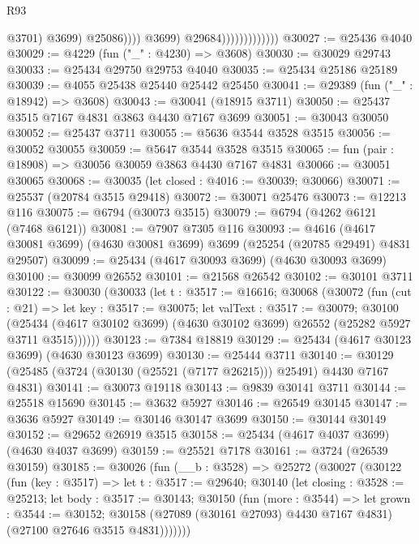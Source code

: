 \begin{lexlean}{R93}
\begin{coremodule}
                                            @3701)
                                          @3699)
                                        @25086))))
                                @3699)
                              @29684)))))))))))))
@30027 := @25436 @4040
@30029 := @4229 (fun ("_" : @4230) => @3608)
@30030 := @30029 @29743
@30033 := @25434 @29750 @29753 @4040
@30035 := @25434 @25186 @25189
@30039 := @4055 @25438 @25440 @25442 @25450
@30041 := @29389 (fun ("_" : @18942) => @3608)
@30043 := @30041 (@18915 @3711)
@30050 := @25437 @3515 @7167 @4831 @3863 @4430 @7167 @3699
@30051 := @30043 @30050
@30052 := @25437 @3711
@30055 := @5636 @3544 @3528 @3515
@30056 := @30052 @30055
@30059 := @5647 @3544 @3528 @3515
@30065 := fun (pair : @18908) => @30056 @30059 @3863 @4430 @7167 @4831
@30066 := @30051 @30065
@30068 := @30035 (let closed : @4016 := @30039; @30066)
@30071 := @25537 (@20784 @3515 @29418)
@30072 := @30071 @25476
@30073 := @12213 @116
@30075 := @6794 (@30073 @3515)
@30079 := @6794 (@4262 @6121 (@7468 @6121))
@30081 := @7907 @7305 @116
@30093 := @4616
    (@4617 @30081 @3699)
    (@4630 @30081 @3699)
    @3699
    (@25254 (@20785 @29491) @4831 @29507)
@30099 := @25434 (@4617 @30093 @3699) (@4630 @30093 @3699)
@30100 := @30099 @26552
@30101 := @21568 @26542
@30102 := @30101 @3711
@30122 := @30030
    (@30033
      (let t : @3517 := @16616;
      @30068
        (@30072
          (fun (cut : @21) =>
          let key : @3517 := @30075;
          let valText : @3517 := @30079;
          @30100
            (@25434 (@4617 @30102 @3699) (@4630 @30102 @3699) @26552 (@25282 @5927 @3711 @3515))))))
@30123 := @7384 @18819
@30129 := @25434 (@4617 @30123 @3699) (@4630 @30123 @3699)
@30130 := @25444 @3711
@30140 := @30129 (@25485 (@3724 (@30130 (@25521 (@7177 @26215))) @25491) @4430 @7167 @4831)
@30141 := @30073 @19118
@30143 := @9839 @30141 @3711
@30144 := @25518 @15690
@30145 := @3632 @5927
@30146 := @26549 @30145
@30147 := @3636 @5927
@30149 := @30146 @30147 @3699
@30150 := @30144 @30149
@30152 := @29652 @26919 @3515
@30158 := @25434 (@4617 @4037 @3699) (@4630 @4037 @3699)
@30159 := @25521 @7178
@30161 := @3724 (@26539 @30159)
@30185 := @30026
    (fun (__b : @3528) =>
    @25272
      (@30027
        (@30122
          (fun (key : @3517) =>
          let t : @3517 := @29640;
          @30140
            (let closing : @3528 := @25213;
            let body : @3517 := @30143;
            @30150
              (fun (more : @3544) =>
              let grown : @3544 := @30152;
              @30158 (@27089 (@30161 @27093) @4430 @7167 @4831) (@27100 @27646 @3515 @4831)))))))

\end{coremodule}
\end{lexlean}
